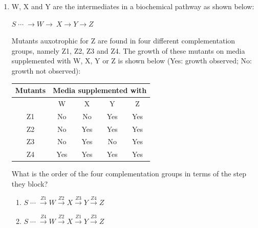 \documentclass[journal,12pt,onecolumn]{IEEEtran}
\theoremstyle{remark}
\begin{document}
\begin{enumerate}[label=Q\arabic*:]
\begin{enumerate}[label=Q\arabic*:, start=26, leftmargin=2em]
\begin{multicols}{2}
\begin{enumerate}[label=\alph*)]

\item P and R only
\item P and S only
\item P, Q and R only
\item Q and R only

\end{enumerate}
\end{multicols}\hfill$\brak{GATE\ BT\ 2020}$

\item W, X and Y are the intermediates in a biochemical pathway as shown below:\\
\begin{center}
$S{\;\cdots\;}\longrightarrow W\longrightarrow\ X\longrightarrow Y\longrightarrow
Z$\\
\end{center}
Mutants auxotrophic for Z are found in four different complementation groups, namely Z1, Z2, Z3 and Z4. The growth of these mutants on media supplemented with W, X, Y or Z is shown below (Yes: growth observed; No: growth not observed):
\begin{center}
\begin{tabular}{|c|c|c|c|c|}
\hline
\textbf{Mutants} & \multicolumn{4}{c|}{\textbf{Media supplemented with}} \\
\hline
 & W & X & Y & Z \\
\hline
Z1 & No & No & Yes & Yes \\
\hline
Z2 & No & Yes & Yes & Yes \\
\hline
Z3 & No & Yes & No & Yes \\
\hline
Z4 & Yes & Yes & Yes & Yes \\
\hline
\end{tabular}
\end{center}
What is the order of the four complementation groups in terms of the step they
block?\\
\begin{multicols}{2}
\begin{enumerate}[label=\alph*)]
\item $S{\;\cdots\;}\xrightarrow{Z1} W\xrightarrow{Z2} X\xrightarrow{Z3}Y\xrightarrow{Z4}Z$\\

\item $S{\;\cdots\;}\xrightarrow{Z4} W\xrightarrow{Z2} X\xrightarrow{Z1}Y\xrightarrow{Z3}Z$\\


\end{enumerate}
\end{multicols}
\end{enumerate}
\end{enumerate}
\end{document}
